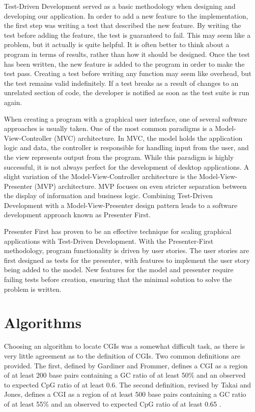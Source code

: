 \documentclass{bioinfo}
\begin{document}
Test-Driven Development served as a basic methodology when designing
and developing our application. In order to add a new feature to the
implementation, the first step was writing a test that described the
new feature. By writing the test before adding the feature, the test
is guaranteed to fail. This may seem like a problem, but it actually
is quite helpful. It is often better to think about a program in terms
of results, rather than how it should be designed. Once the test has
been written, the new feature is added to the program in order to make
the test pass. Creating a test before writing any function may seem like
overhead, but the test remains valid indefinitely. If a test breaks as
a result of changes to an unrelated section of code, the developer is
notified as soon as the test suite is run again.

When creating a program with a graphical user interface, one of
several software approaches is usually taken. One of the most common
paradigms is a Model-View-Controller (MVC) architecture. In MVC, the
model holds the application logic and data, the controller is
responsible for handling input from the user, and the view represents
output from the program. While this paradigm is highly successful, it
is not always perfect for the development of desktop applications. A
slight variation of the Model-View-Controller architecture is the
Model-View-Presenter (MVP) architecture. MVP focuses on even stricter
separation between the display of information and business
logic. Combining Test-Driven Development with a Model-View-Presenter
design pattern leads to a software development approach known as
Presenter First.

Presenter First \citep{Alles:2006:PFO:1155439.1155482} has proven to
be an effective technique for scaling graphical applications with
Test-Driven Development. With the Presenter-First methodology, program
functionality is driven by user stories. The user stories are first
designed as tests for the presenter, with features to implement the
user story being added to the model. New features for the model and
presenter require failing tests before creation, ensuring that the
minimal solution to solve the problem is written.

\section{Algorithms}

Choosing an algorithm to locate CGIs was a somewhat difficult
task, as there is very little agreement as to the definition of
CGIs. Two common definitions are provided. The first, defined by
Gardiner and Frommer, defines a CGI as a region of at least 200 base
pairs containing a GC ratio of at least 50\% and an observed to
expected CpG ratio of at least 0.6. The second definition, revised by
Takai and Jones, defines a CGI as a region of at least 500 base pairs containing a GC ratio of at least 55\% and an observed to
expected CpG ratio of at least 0.65 \citep{pmid11891299}.
\end{document}
